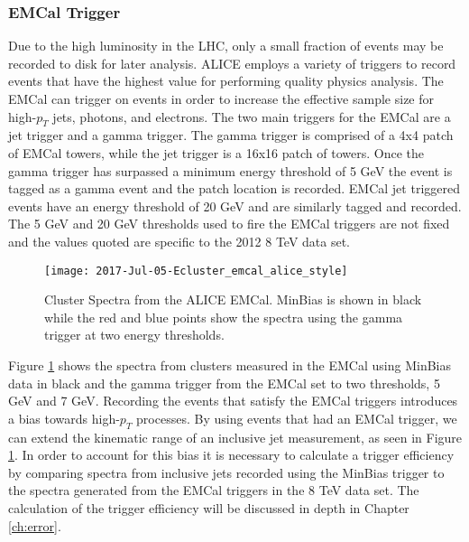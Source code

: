 \subsubsection{EMCal Trigger}


Due to the high luminosity in the LHC, only a small fraction of events may be recorded to disk for later analysis.  ALICE employs a variety of triggers to record events that have the highest value for performing quality physics analysis.  The EMCal can trigger on events in order to increase the effective sample size for high-$p_{T}$ jets, photons, and electrons.  The two main triggers\cite{bourrion2010level}\cite{bourrion2013alice} for the EMCal are a jet trigger and a gamma trigger.  The gamma trigger is comprised of a 4x4 patch of EMCal towers, while the jet trigger is a 16x16 patch of towers.  Once the gamma trigger has surpassed a minimum energy threshold of 5 GeV\cite{Kral2012261} the event is tagged as a gamma event and the patch location is recorded.  EMCal jet triggered events have an energy threshold of 20 GeV and are similarly tagged and recorded.  The 5 GeV and 20 GeV thresholds used to fire the EMCal triggers are not fixed and the values quoted are specific to the 2012 8 TeV data set. 

\begin{figure}[b!]
\texttt{[image: 2017-Jul-05-Ecluster\_emcal\_alice\_style]}
\centering
\caption{Cluster Spectra from the ALICE EMCal.  MinBias is shown in black while the red and blue points show the spectra using the gamma trigger at two energy thresholds\cite{Jahnke:2018mrq}.}
\label{fig:EMCalSpectra}
\end{figure}

Figure \ref{fig:EMCalSpectra} shows the spectra from clusters measured in the EMCal using MinBias data in black and the gamma trigger from the EMCal set to two thresholds, 5 GeV and 7 GeV.  Recording the events that satisfy the EMCal triggers introduces a bias towards high-$p_{T}$ processes.  By using events that had an EMCal trigger, we can extend the kinematic range of an inclusive jet measurement, as seen in Figure \ref{fig:EMCalSpectra}.  In order to account for this bias it is necessary to calculate a trigger efficiency by comparing spectra from inclusive jets recorded using the MinBias trigger to the spectra generated from the EMCal triggers in the 8 TeV data set.  The calculation of the trigger efficiency will be discussed in depth in Chapter \ref{ch:error}.